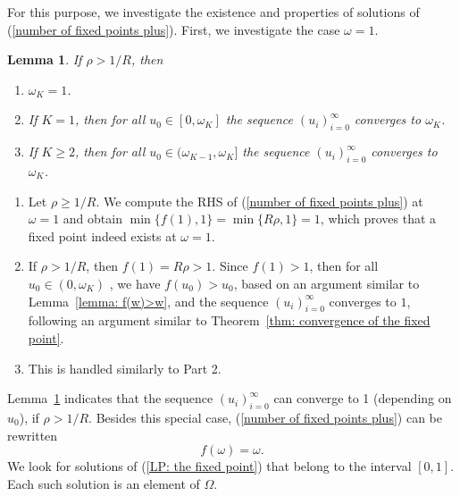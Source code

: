 \documentclass{IEEEtran}
\newtheorem{lemma}{Lemma}
\begin{document}
For this purpose, we investigate the existence and properties of solutions of (\ref{number of fixed points plus}).
First, we investigate the case $\omega = 1$.
\begin{lemma} \label{lemma:overload fixed point is stable}
If $\rho > 1/R$, then
\begin{enumerate}
\item $\omega_K=1$.
\item If $K =1 $, then for all $u_0 \in [0,\omega_K]$ the sequence $(u_i)_{i=0}^{\infty}$ converges to $\omega_K$.
\item If $K \geq 2$, then for all $u_0 \in (\omega_{K-1},\omega_K]$ the sequence $(u_i)_{i=0}^{\infty}$ converges to $\omega_K$.
\end{enumerate}
\end{lemma}
\begin{IEEEproof}
\leavevmode
\begin{enumerate}
\item Let $\rho \geq 1/R$. We compute the RHS of (\ref{number of fixed points
plus}) at $\omega=1$ and obtain  $\min\{ f(1), 1\} = \min\{ R\rho, 1\} =1$, which proves that a fixed point indeed exists at $\omega=1$.

\item If $\rho > 1/R$, then $f(1)=R \rho>1$. Since $f(1)>1$, then for all $u_0 \in (0, \omega_K)$ , we have $f(u_0) > u_0$, based on an argument
    similar to Lemma~\ref{lemma: f(w)>w}, and the sequence $(u_i)_{i=0}^{\infty}$ converges to $1$, following an argument similar to
    Theorem~\ref{thm: convergence of the fixed point}.

\item This is handled similarly to Part 2.
\end{enumerate}
\end{IEEEproof}

Lemma~\ref{lemma:overload fixed point is stable} indicates that the sequence $(u_i)_{i=0}^{\infty}$ can converge to 1 (depending on $u_0$), if $
\rho > 1/R$. Besides this special case, (\ref{number of fixed points plus}) can be rewritten
\begin{equation} \label{LP: the fixed point}
f(\omega) = \omega.
\end{equation}
We look for solutions of (\ref{LP: the fixed point}) that belong to the interval $[0,1]$. Each such solution is an element of $\Omega$.
\end{document}
